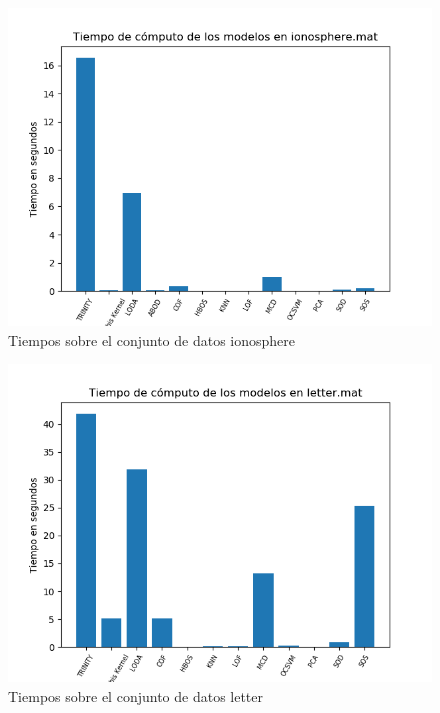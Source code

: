 \begin{figure}[H]
	\centering
	\includegraphics[scale=0.7]{imagenes/imgs-exp1/times/ionosphere}
	\caption{Tiempos sobre el conjunto de datos ionosphere}
	\label{ionosphere_times}
\end{figure}

\begin{figure}[H]
	\centering
	\includegraphics[scale=0.7]{imagenes/imgs-exp1/times/letter}
	\caption{Tiempos sobre el conjunto de datos letter}
	\label{letter_times}
\end{figure}

